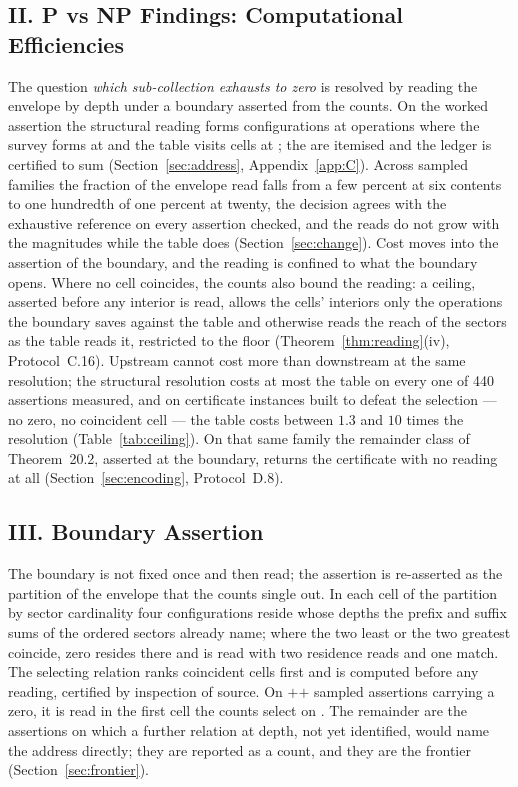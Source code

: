 \documentclass[pdflatex,sn-mathphys-num]{sn-jnl}
\theoremstyle{thmstyleone}%
\theoremstyle{thmstyletwo}%
\theoremstyle{thmstylethree}%
\begin{document}
\subsection*{II. P vs NP Findings: Computational Efficiencies}
The question \emph{which sub-collection exhausts to zero} is resolved by reading the envelope by depth under a boundary asserted from the counts. On the worked assertion the structural reading forms \workedStructFormed{} configurations at \workedStructOps{} operations where the survey forms \workedSurveyFormed{} at \workedSurveyOps{} and the table visits \workedTableFormed{} cells at \workedTableOps{}; the \workedStructOps{} are itemised and the ledger is certified to sum (Section~\ref{sec:address}, Appendix~\ref{app:C}). Across sampled families the fraction of the envelope read falls from a few percent at six contents to one hundredth of one percent at twenty, the decision agrees with the exhaustive reference on every assertion checked, and the reads do not grow with the magnitudes while the table does (Section~\ref{sec:change}). Cost moves into the assertion of the boundary, and the reading is confined to what the boundary opens. Where no cell coincides, the counts also bound the reading: a ceiling, asserted before any interior is read, allows the cells' interiors only the operations the boundary saves against the table and otherwise reads the reach of the sectors as the table reads it, restricted to the floor (Theorem~\ref{thm:reading}(iv), Protocol~C.16). Upstream cannot cost more than downstream at the same resolution; the structural resolution costs at most the table on every one of 440 assertions measured, and on certificate instances built to defeat the selection --- no zero, no coincident cell --- the table costs between $1.3$ and $10$ times the resolution (Table~\ref{tab:ceiling}). On that same family the remainder class of Theorem~20.2, asserted at the boundary, returns the certificate with no reading at all (Section~\ref{sec:encoding}, Protocol~D.8).

\subsection*{III. Boundary Assertion}
The boundary is not fixed once and then read; the assertion is re-asserted as the partition of the envelope that the counts single out. In each cell of the partition by sector cardinality four configurations reside whose depths the prefix and suffix sums of the ordered sectors already name; where the two least or the two greatest coincide, zero resides there and is read with two residence reads and one match. The selecting relation ranks coincident cells first and is computed before any reading, certified by inspection of source. On \selFirst{}$+$\selSecond{}$+$\selLater{} sampled assertions carrying a zero, it is read in the first cell the counts select on \selFirst{}. The remainder are the assertions on which a further relation at depth, not yet identified, would name the address directly; they are reported as a count, and they are the frontier (Section~\ref{sec:frontier}).
\end{document}
